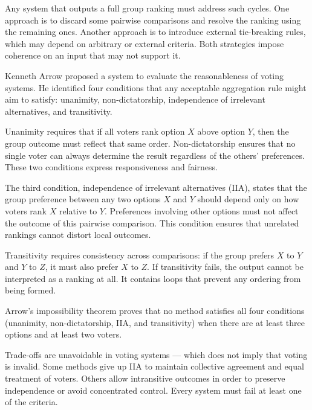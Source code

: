 Any system that outputs a full group ranking must address such cycles. One approach is to discard some pairwise comparisons and resolve the ranking using the remaining ones. Another approach is to introduce external tie-breaking rules, which may depend on arbitrary or external criteria. Both strategies impose coherence on an input that may not support it.

Kenneth Arrow proposed a system to evaluate the reasonableness of voting systems. He identified four conditions that any acceptable aggregation rule might aim to satisfy: unanimity, non-dictatorship, independence of irrelevant alternatives, and transitivity.

Unanimity requires that if all voters rank option $X$ above option $Y$, then the group outcome must reflect that same order. Non-dictatorship ensures that no single voter can always determine the result regardless of the others' preferences. These two conditions express responsiveness and fairness.

The third condition, independence of irrelevant alternatives (IIA), states that the group preference between any two options $X$ and $Y$ should depend only on how voters rank $X$ relative to $Y$. Preferences involving other options must not affect the outcome of this pairwise comparison. This condition ensures that unrelated rankings cannot distort local outcomes.

Transitivity requires consistency across comparisons: if the group prefers $X$ to $Y$ and $Y$ to $Z$, it must also prefer $X$ to $Z$. If transitivity fails, the output cannot be interpreted as a ranking at all. It contains loops that prevent any ordering from being formed.

Arrow’s impossibility theorem proves that no method satisfies all four conditions (unanimity, non-dictatorship, IIA, and transitivity) when there are at least three options and at least two voters. 

Trade-offs are unavoidable in voting systems — which does not imply that voting is invalid. Some methods give up IIA to maintain collective agreement and equal treatment of voters. Others allow intransitive outcomes in order to preserve independence or avoid concentrated control. Every system must fail at least one of the criteria.

\newpage

